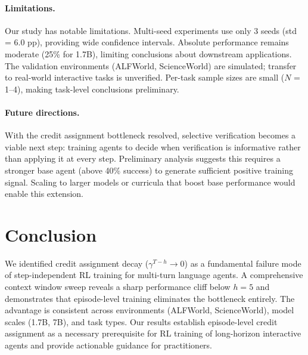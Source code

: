 \documentclass[11pt]{article}
\begin{document}
\paragraph{Limitations.}
Our study has notable limitations. Multi-seed experiments use only 3 seeds (std = 6.0 pp), providing wide confidence intervals. Absolute performance remains moderate (25\% for 1.7B), limiting conclusions about downstream applications. The validation environments (ALFWorld, ScienceWorld) are simulated; transfer to real-world interactive tasks is unverified. Per-task sample sizes are small ($N$ = 1--4), making task-level conclusions preliminary.

\paragraph{Future directions.}
With the credit assignment bottleneck resolved, selective verification becomes a viable next step: training agents to decide when verification is informative rather than applying it at every step. Preliminary analysis suggests this requires a stronger base agent (above 40\% success) to generate sufficient positive training signal. Scaling to larger models or curricula that boost base performance would enable this extension.

\section{Conclusion}

We identified credit assignment decay ($\gamma^{T-h} \to 0$) as a fundamental failure mode of step-independent RL training for multi-turn language agents. A comprehensive context window sweep reveals a sharp performance cliff below $h=5$ and demonstrates that episode-level training eliminates the bottleneck entirely. The advantage is consistent across environments (ALFWorld, ScienceWorld), model scales (1.7B, 7B), and task types. Our results establish episode-level credit assignment as a necessary prerequisite for RL training of long-horizon interactive agents and provide actionable guidance for practitioners.
\end{document}
